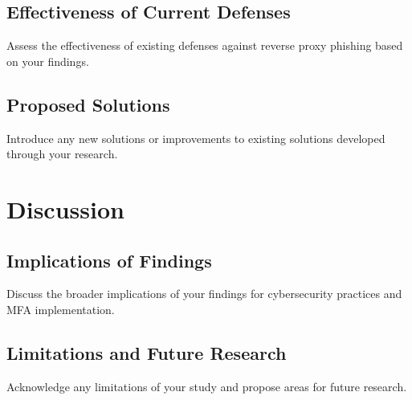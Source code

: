 \documentclass[12pt]{scrbook}
\begin{document}
\section{Effectiveness of Current Defenses} Assess the effectiveness of existing
defenses against reverse proxy phishing based on your findings.

\section{Proposed Solutions} Introduce any new solutions or improvements to
existing solutions developed through your research.

\chapter{Discussion} \section{Implications of Findings} Discuss the broader
implications of your findings for cybersecurity practices and MFA
implementation.

\section{Limitations and Future Research} Acknowledge any limitations of your
study and propose areas for future research.

\newpage  
\end{document}
